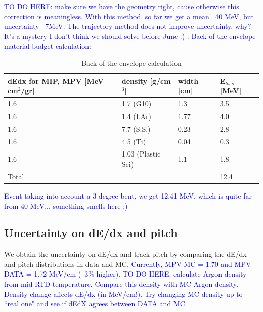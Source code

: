 \textcolor{blue}{ TO DO HERE: make sure we have the geometry right, cause otherwise this correction is meaningless.  With this method, so far we get a mean ~40 MeV, but uncertainty ~7MeV. 
The trajectory method does not improve uncertainty, why? It's a mystery I don't think we should solve before June :) .
Back of the envelope material budget calculation:}
\begin{table}[h!]
\centering
\caption{Back of the envelope calculation}
\label{my-label}
\begin{tabular}{|l|l|l|l|}
\hline
dEdx for MIP, MPV {[}MeV cm$^2$/gr{]} & density {[}g/cm$^3${]} & width {[}cm{]} & E$_{loss}$ {[}MeV{]} \\ \hline
1.6                                                 & 1.7 (G10)                            & 1.3            & 3.5                   \\
1.6                                                 & 1.4 (LAr)                            & 1.77           & 4.0                   \\
1.6                                                 & 7.7 (S.S.)                           & 0.23           & 2.8                   \\
1.6                                                 & 4.5 (Ti)                             & 0.04           & 0.3                   \\ 
1.6                                                 & 1.03 (Plastic Sci)                   & 1.1            & 1.8                   \\ \hline
Total                                               &                                      &                & 12.4                  \\ \hline
\end{tabular}
\end{table}


\textcolor{blue}{Event taking into account a 3 degree bent, we get 12.41 MeV, which is quite far from 40 MeV... something smells here ;)}

\subsection{Uncertainty on dE/dx and pitch}
We obtain the uncertainty on dE/dx and track pitch by comparing the dE/dx and pitch distributions in data and MC.
\textcolor{blue}{ Currently, MPV MC = 1.70 and MPV DATA = 1.72 MeV/cm (~3\% higher).
TO DO HERE: calculate Argon density from mid-RTD temperature. Compare this  density with MC Argon density. 
Density change  affects dE/dx (in MeV/cm!). Try changing MC density up to ``real one" and see if dEdX agrees between DATA and MC}


